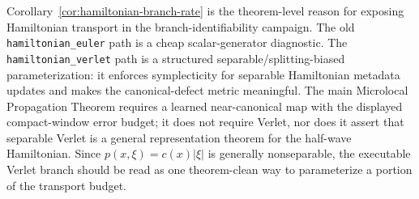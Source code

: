 Corollary~\ref{cor:hamiltonian-branch-rate} is the theorem-level reason for exposing Hamiltonian transport in the branch-identifiability campaign. The old \texttt{hamiltonian\_euler} path is a cheap scalar-generator diagnostic. The \texttt{hamiltonian\_verlet} path is a structured separable/splitting-biased parameterization: it enforces symplecticity for separable Hamiltonian metadata updates and makes the canonical-defect metric meaningful.  The main Microlocal Propagation Theorem requires a learned near-canonical map with the displayed compact-window error budget; it does not require Verlet, nor does it assert that separable Verlet is a general representation theorem for the half-wave Hamiltonian.  Since $p(x,\xi)=c(x)|\xi|$ is generally nonseparable, the executable Verlet branch should be read as one theorem-clean way to parameterize a portion of the transport budget.

